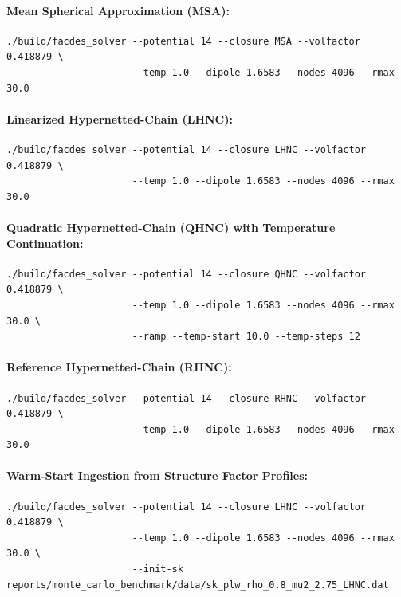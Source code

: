 \documentclass[11pt,a4paper]{article}
\begin{document}
\paragraph{Mean Spherical Approximation (MSA):}
\begin{verbatim}
./build/facdes_solver --potential 14 --closure MSA --volfactor 0.418879 \
                      --temp 1.0 --dipole 1.6583 --nodes 4096 --rmax 30.0
\end{verbatim}

\paragraph{Linearized Hypernetted-Chain (LHNC):}
\begin{verbatim}
./build/facdes_solver --potential 14 --closure LHNC --volfactor 0.418879 \
                      --temp 1.0 --dipole 1.6583 --nodes 4096 --rmax 30.0
\end{verbatim}

\paragraph{Quadratic Hypernetted-Chain (QHNC) with Temperature Continuation:}
\begin{verbatim}
./build/facdes_solver --potential 14 --closure QHNC --volfactor 0.418879 \
                      --temp 1.0 --dipole 1.6583 --nodes 4096 --rmax 30.0 \
                      --ramp --temp-start 10.0 --temp-steps 12
\end{verbatim}

\paragraph{Reference Hypernetted-Chain (RHNC):}
\begin{verbatim}
./build/facdes_solver --potential 14 --closure RHNC --volfactor 0.418879 \
                      --temp 1.0 --dipole 1.6583 --nodes 4096 --rmax 30.0
\end{verbatim}

\paragraph{Warm-Start Ingestion from Structure Factor Profiles:}
\begin{verbatim}
./build/facdes_solver --potential 14 --closure LHNC --volfactor 0.418879 \
                      --temp 1.0 --dipole 1.6583 --nodes 4096 --rmax 30.0 \
                      --init-sk reports/monte_carlo_benchmark/data/sk_plw_rho_0.8_mu2_2.75_LHNC.dat
\end{verbatim}
\end{document}
